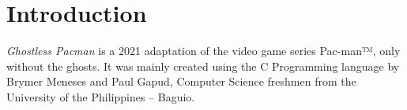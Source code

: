 
\section{Introduction}

\emph{Ghostless Pacman} is a 2021 adaptation of the video game series Pac-man™,
only without the ghosts. It was mainly created using the C Programming
language by Brymer Meneses and Paul Gapud, Computer Science freshmen
from the University of the Philippines -- Baguio.
